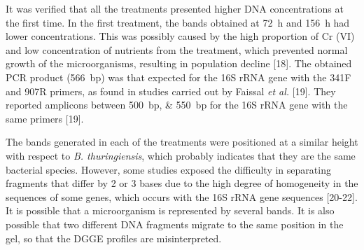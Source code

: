 \documentclass{univsciauth}
\begin{document}
It was verified that all the treatments presented higher DNA
concentrations at the first time. In the first treatment, the bands
obtained at \SI{72}{h} and \SI{156}{h} had lower concentrations. This was possibly
caused by the high proportion of Cr (VI) and low concentration of
nutrients from the treatment, which prevented normal growth of the
microorganisms, resulting in population decline {[}18{]}. The obtained
PCR product (\SI{566}{bp}) was that expected for the 16S rRNA gene with the
341F and 907R primers, as found in studies carried out by Faissal
\emph{et al.} {[}19{]}. They reported amplicons between \SIlist{500;550}{bp}
for the 16S rRNA gene with the same primers {[}19{]}.

The bands generated in each of the treatments were positioned at a
similar height with respect to \emph{B. thuringiensis}, which probably
indicates that they are the same bacterial species. However, some
studies exposed the difficulty in separating fragments that differ by 2
or 3 bases due to the high degree of homogeneity in the sequences of
some genes, which occurs with the 16S rRNA gene sequences {[}20-22{]}.
It is possible that a microorganism is represented by several bands. It
is also possible that two different DNA fragments migrate to the same
position in the gel, so that the DGGE profiles are misinterpreted.
\end{document}
